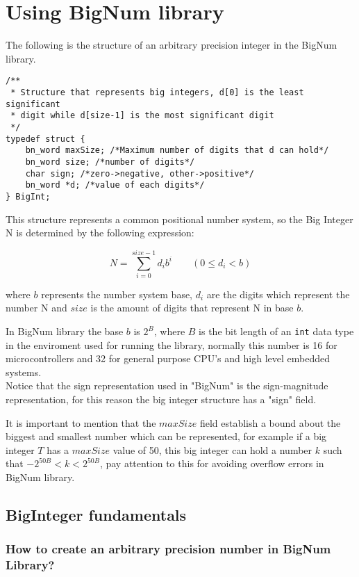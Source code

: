 \documentclass{book}
\begin{document}
\chapter{Using BigNum library}
\label{chap:api}
The following is the structure of an arbitrary precision integer in the BigNum library.
\begin{verbatim}
/**
 * Structure that represents big integers, d[0] is the least significant
 * digit while d[size-1] is the most significant digit
 */
typedef struct {
    bn_word maxSize; /*Maximum number of digits that d can hold*/
    bn_word size; /*number of digits*/
    char sign; /*zero->negative, other->positive*/
    bn_word *d; /*value of each digits*/
} BigInt;
\end{verbatim}

This structure represents a common positional number system, so the Big Integer N is determined by the following expression:

\[N = \sum_{i=0}^{size-1}{d_i b^i} \quad\quad (0 \le d_i < b) \]

where $b$ represents the number system base, $d_i$  are the digits which represent the number N and $size$ is the amount of digits that represent N in base $b$.

In BigNum library the base $b$ is $2^B$, where $B$ is the bit length of an \verb+int+ data type in the enviroment used for running the library, normally this number is 16 for microcontrollers and 32 for general purpose CPU's and high level embedded systems.\\

Notice that the sign representation used in "BigNum" is the sign-magnitude representation, for this reason the big integer structure has a "sign" field.

It is important to mention that the $maxSize$ field establish a bound about the biggest and smallest number which can be represented, for example if a big integer $T$ has a $maxSize$ value of 50, this big integer can hold a number $k$ such that $-2^{50B}<k<2^{50B}$, pay attention to this for avoiding overflow errors in BigNum library.

\section{BigInteger fundamentals}

\subsection{How to create an arbitrary precision number in BigNum Library?}
\end{document}

